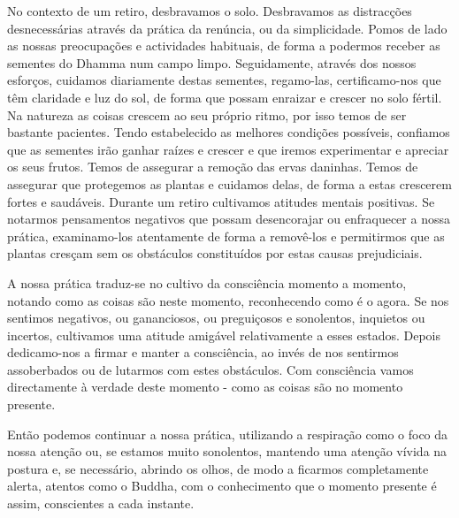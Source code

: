 No contexto de um retiro, desbravamos o solo. Desbravamos as distracções
desnecessárias através da prática da renúncia, ou da simplicidade. Pomos
de lado as nossas preocupações e actividades habituais, de forma a
podermos receber as sementes do Dhamma num campo limpo. Seguidamente,
através dos nossos esforços, cuidamos diariamente destas sementes,
regamo-las, certificamo-nos que têm claridade e luz do sol, de forma que
possam enraizar e crescer no solo fértil. Na natureza as coisas crescem
ao seu próprio ritmo, por isso temos de ser bastante pacientes. Tendo
estabelecido as melhores condições possíveis, confiamos que as sementes
irão ganhar raízes e crescer e que iremos experimentar e apreciar os
seus frutos. Temos de assegurar a remoção das ervas daninhas. Temos de
assegurar que protegemos as plantas e cuidamos delas, de forma a estas
crescerem fortes e saudáveis. Durante um retiro cultivamos atitudes
mentais positivas. Se notarmos pensamentos negativos que possam
desencorajar ou enfraquecer a nossa prática, \mbox{examinamo-los} atentamente
de forma a removê-los e permitirmos que as plantas cresçam sem os
obstáculos constituídos por estas causas prejudiciais.

A nossa prática traduz-se no cultivo da consciência momento a momento,
notando como as coisas são neste momento, reconhecendo como é o agora.
Se nos sentimos negativos, ou gananciosos, ou preguiçosos e sonolentos,
inquietos ou incertos, cultivamos uma atitude amigável relativamente a
esses estados. Depois dedicamo-nos a firmar e manter a consciência, ao
invés de nos sentirmos assoberbados ou de lutarmos com estes obstáculos.
Com consciência vamos directamente à verdade deste momento - como as
coisas são no momento presente.

Então podemos continuar a nossa prática, utilizando a respiração como o
foco da nossa atenção ou, se estamos muito sonolentos, mantendo uma
atenção vívida na postura e, se necessário, abrindo os olhos, de modo a
ficarmos completamente alerta, atentos como o Buddha, com o conhecimento
que o momento presente é assim, conscientes a cada instante.

